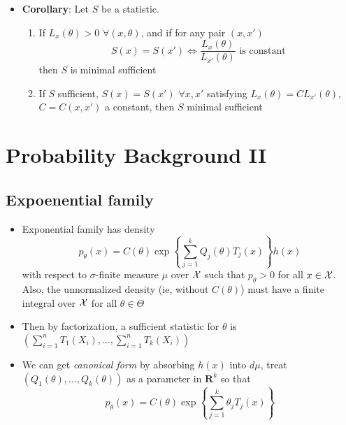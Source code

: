 \documentclass[fontsize=5pt]{scrartcl}
\begin{document}
\begin{multicols}{2}
\begin{itemize}
\item \textbf{Corollary}: Let $S$ be a statistic.
  \begin{enumerate}
  \item If $L_{x}(\theta)>0$ $\forall(x,\theta)$, and if for any pair
    $(x,x')$
    \begin{equation}
      S(x) = S(x') \iff \frac{L_{x}(\theta)}{L_{x'}(\theta)}\text{ is constant}
    \end{equation}
    then $S$ is minimal sufficient
  \item If $S$ sufficient, $S(x) = S(x')$ $\forall x,x'$ satisfying
    $L_{x}(\theta)=CL_{x'}(\theta)$, $C=C(x,x')$ a constant, then $S$
    minimal sufficient
  \end{enumerate}

\end{itemize}

\section{Probability Background II}

\subsection{Expoenential family}

\begin{itemize}
\item Exponential family has density
  \begin{equation}
    p_{\theta}(x) = C(\theta)\exp\left\{
      \sum_{j=1}^{k}Q_{j}(\theta)T_{j}(x) \right\} h(x)
  \end{equation}
  with respect to $\sigma$-finite measure $\mu$ over ${\cal X}$ such
  that $p_{\theta}>0$ for all $x\in{\cal X}$. Also, the unnormalized
  density (ie, without $C(\theta)$) must have a finite integral over
  ${\cal X}$ for all $\theta\in\Theta$
\item Then by factorization, a sufficient statistic for $\theta$ is
  $(\sum_{i=1}^{n}T_{1}(X_{i}), \dots, \sum_{i=1}^{n}T_{k}(X_{i}))$

\item We can get \emph{canonical form} by absorbing $h(x)$ into
  $d\mu$, treat $(Q_{1}(\theta),\dots,Q_{k}(\theta))$ as a parameter
  in $\mathbf{R}^{k}$ so that
  \begin{equation}
    p_{\theta}(x) = C(\theta) \exp\left\{ \sum_{j=1}^{k}
      \theta_{j}T_{j}(x) \right\}
  \end{equation}


\end{itemize}
\end{multicols}
\end{document}
